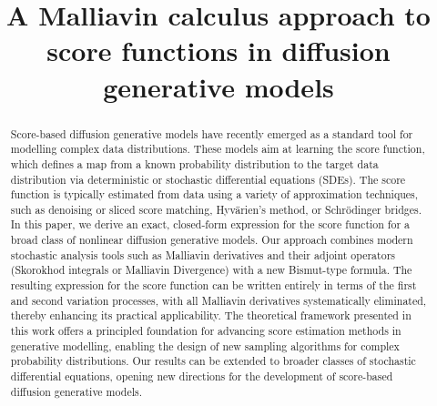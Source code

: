 \documentclass[]{interact}
\newcommand{\1}{\mathbf{1}}
\theoremstyle{plain}%
\theoremstyle{definition}
\theoremstyle{remark}
\numberwithin{equation}{section}
\begin{document}

\title{A Malliavin calculus approach to score functions in diffusion generative models}

\author{
}

\maketitle

\begin{abstract}
Score-based diffusion generative models have recently emerged as a standard tool for modelling complex data distributions. These models aim at learning the score function, which defines a map from a known probability distribution to the target data distribution via deterministic or stochastic differential equations (SDEs). The score function is typically estimated from data using a variety of approximation techniques, such as denoising or sliced score matching, Hyv\"arien's method, or Schr\"odinger bridges. In this paper, we derive an exact, closed-form expression for the score function for a broad class of nonlinear diffusion generative models. Our approach combines modern stochastic analysis tools such as Malliavin derivatives and their adjoint operators (Skorokhod integrals or Malliavin Divergence) with a new Bismut-type formula. The resulting expression for the score function can be written entirely in terms of the first and second variation processes, with all Malliavin derivatives systematically eliminated, thereby enhancing its practical applicability. The theoretical framework presented in this work offers a principled foundation for advancing score estimation methods in generative modelling, enabling the design of new sampling algorithms for complex probability distributions. Our results can be extended to broader classes of stochastic differential equations, opening new directions for the development of score-based diffusion generative models.
\end{abstract}
\end{document}
